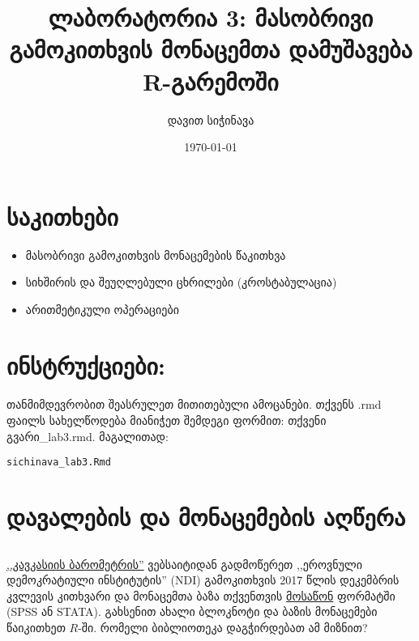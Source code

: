 \documentclass{article}\usepackage[]{graphicx}\usepackage[]{color}
\title{ლაბორატორია 3: მასობრივი გამოკითხვის მონაცემთა დამუშავება R-გარემოში}
\author{დავით სიჭინავა}
\date{\today}
\makeatletter
\newcommand{\hlstd}[1]{\textcolor[rgb]{0.345,0.345,0.345}{#1}}%
\newenvironment{kframe}{%
 \def\at@end@of@kframe{}%
 \ifinner\ifhmode%
  \def\at@end@of@kframe{\end{minipage}}%
  \begin{minipage}{\columnwidth}%
 \fi\fi%
 \def\FrameCommand##1{\hskip\@totalleftmargin \hskip-\fboxsep
 \colorbox{shadecolor}{##1}\hskip-\fboxsep
     \hskip-\linewidth \hskip-\@totalleftmargin \hskip\columnwidth}%
 \MakeFramed {\advance\hsize-\width
   \@totalleftmargin\z@ \linewidth\hsize
   \@setminipage}}%
 {\par\unskip\endMakeFramed%
 \at@end@of@kframe}
\newenvironment{knitrout}{}{} %
\makeatother
\begin{document}
\maketitle
\section*{საკითხები}
\begin{itemize}
\item მასობრივი გამოკითხვის მონაცემების წაკითხვა
\item სიხშირის და შეუღლებული ცხრილები (კროსტაბულაცია)
\item არითმეტიკული ოპერაციები
\end{itemize}

\section*{ინსტრუქციები:}

\paragraph{}
თანმიმდევრობით შეასრულეთ მითითებული ამოცანები. თქვენს .rmd ფაილს სახელწოდება მიანიჭეთ შემდეგი ფორმით: თქვენი გვარი\_lab3.rmd. მაგალითად:

\begin{knitrout}
\color{fgcolor}\begin{kframe}
\begin{alltt}
\hlstd{sichinava_lab3.Rmd}
\end{alltt}
\end{kframe}
\end{knitrout}

\section*{დავალების და მონაცემების აღწერა}

\subsection*{}

\href{http://caucasusbarometer.org/ge/nd2017ge/downloads/}{,,კავკასიის ბარომეტრის''} ვებსაიტიდან გადმოწერეთ ,,ეროვნული დემოკრატიული ინსტიტუტის'' (NDI) გამოკითხვის 2017 წლის დეკემბრის კვლევის კითხვარი და მონაცემთა ბაზა თქვენთვის \href{https://www.youtube.com/watch?v=89tH19TH3Z8}{მოსაწონ} ფორმატში (SPSS ან STATA). გახსენით ახალი ბლოკნოტი და ბაზის მონაცემები წაიკითხეთ $R$-ში. რომელი ბიბლიოთეკა დაგჭირდებათ ამ მიზნით?
\end{document}
